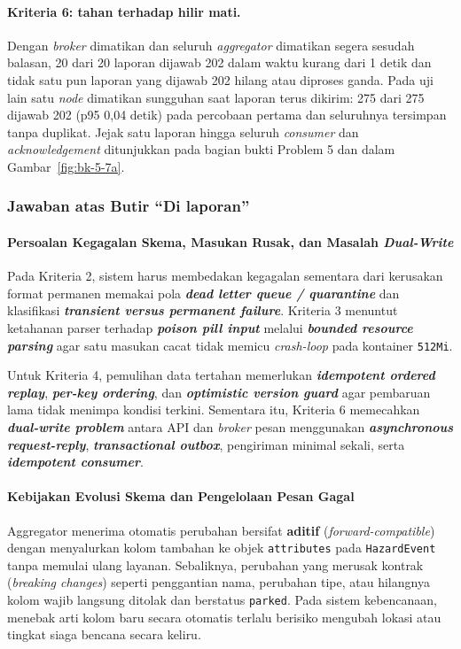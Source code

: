 \paragraph*{Kriteria 6:  tahan terhadap hilir mati.}
Dengan \textit{broker} dimatikan dan seluruh \textit{aggregator} dimatikan segera sesudah balasan, 20 dari 20 laporan dijawab 202 dalam waktu kurang dari 1 detik dan tidak satu pun laporan yang dijawab 202 hilang atau diproses ganda. Pada uji lain satu \textit{node} dimatikan sungguhan saat laporan terus dikirim: 275 dari 275 dijawab 202 (p95 0,04 detik) pada percobaan pertama dan seluruhnya tersimpan tanpa duplikat. Jejak satu laporan hingga seluruh \textit{consumer} dan \textit{acknowledgement} ditunjukkan pada bagian bukti Problem 5 dan dalam Gambar~\ref{fig:bk-5-7a}.

\subsubsection{Jawaban atas Butir ``Di laporan''}

\paragraph*{Persoalan Kegagalan Skema, Masukan Rusak, dan Masalah \textit{Dual-Write}}
Pada Kriteria 2, sistem harus membedakan kegagalan sementara dari kerusakan format permanen memakai pola \textbf{\textit{dead letter queue / quarantine}} dan klasifikasi \textbf{\textit{transient versus permanent failure}}. Kriteria 3 menuntut ketahanan parser terhadap \textbf{\textit{poison pill input}} melalui \textbf{\textit{bounded resource parsing}} agar satu masukan cacat tidak memicu \textit{crash-loop} pada kontainer \texttt{512Mi}.

Untuk Kriteria 4, pemulihan data tertahan memerlukan \textbf{\textit{idempotent ordered replay}}, \textbf{\textit{per-key ordering}}, dan \textbf{\textit{optimistic version guard}} agar pembaruan lama tidak menimpa kondisi terkini. Sementara itu, Kriteria 6 memecahkan \textbf{\textit{dual-write problem}} antara API dan \textit{broker} pesan menggunakan \textbf{\textit{asynchronous request-reply}}, \textbf{\textit{transactional outbox}}, pengiriman minimal sekali, serta \textbf{\textit{idempotent consumer}}.

\paragraph*{Kebijakan Evolusi Skema dan Pengelolaan Pesan Gagal}
Aggregator menerima otomatis perubahan bersifat \textbf{aditif} (\textit{forward-compatible}) dengan menyalurkan kolom tambahan ke objek \texttt{attributes} pada \texttt{HazardEvent} tanpa memulai ulang layanan. Sebaliknya, perubahan yang merusak kontrak (\textit{breaking changes}) seperti penggantian nama, perubahan tipe, atau hilangnya kolom wajib langsung ditolak dan berstatus \texttt{parked}. Pada sistem kebencanaan, menebak arti kolom baru secara otomatis terlalu berisiko mengubah lokasi atau tingkat siaga bencana secara keliru.

